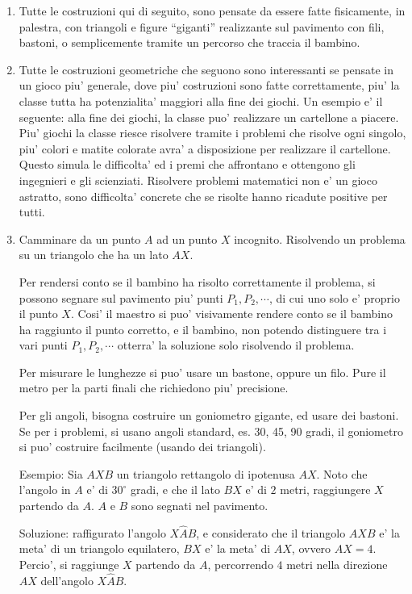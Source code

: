 \documentclass[a4paper]{article}
\begin{document}
\begin{enumerate}
    \item Tutte le costruzioni qui di seguito, sono pensate da essere fatte fisicamente, in palestra, con triangoli e figure ``giganti'' realizzante sul pavimento con fili, bastoni, o semplicemente tramite un percorso che traccia il bambino.

    \item Tutte le costruzioni geometriche che seguono sono interessanti se pensate in un gioco piu' generale, dove piu' costruzioni sono fatte correttamente, piu' la classe tutta ha potenzialita' maggiori alla fine dei giochi. Un esempio e' il seguente: alla fine dei giochi, la classe puo' realizzare un cartellone a piacere. Piu' giochi la classe riesce risolvere tramite i problemi che risolve ogni singolo, piu' colori e matite colorate avra' a disposizione per realizzare il cartellone. Questo simula le difficolta' ed i premi che affrontano e ottengono gli ingegnieri e gli scienziati. Risolvere problemi matematici non e' un gioco astratto, sono difficolta' concrete che se risolte hanno ricadute positive per tutti.
    \item Camminare da un punto $A$ ad un punto $X$ incognito. Risolvendo un problema su un triangolo che ha un lato $AX$. 

        Per rendersi conto se il bambino ha risolto correttamente il problema, si possono segnare sul pavimento piu' punti $P_1,P_2,\cdots$, di cui uno solo e' proprio il punto $X$. Cosi' il maestro si puo' visivamente rendere conto se il bambino ha raggiunto il punto corretto, e il bambino, non potendo distinguere tra i vari punti $P_1,P_2,\cdots$ otterra' la soluzione solo risolvendo il problema.

        Per misurare le lunghezze si puo' usare un bastone, oppure un filo. Pure il metro per la parti finali che richiedono piu' precisione.

        Per gli angoli, bisogna costruire un goniometro gigante, ed usare dei bastoni. Se per i problemi, si usano angoli standard, es. 30, 45, 90 gradi, il goniometro si puo' costruire facilmente (usando dei triangoli).

        Esempio: Sia $AXB$ un triangolo rettangolo di ipotenusa $AX$. Noto che l'angolo in $A$ e' di $30^{\circ}$ gradi, e che il lato $BX$ e' di $2$ metri, raggiungere $X$ partendo da $A$. $A$ e $B$ sono segnati nel pavimento.
    
        Soluzione: raffigurato l'angolo $X\hat{A}B$, e considerato che il triangolo $AXB$ e' la meta' di un triangolo equilatero, $BX$ e' la meta' di $AX$, ovvero $AX=4$. Percio', si raggiunge $X$ partendo da $A$, percorrendo $4$ metri nella direzione $AX$ dell'angolo $X\hat{A}B$.



\end{enumerate}
\end{document}
